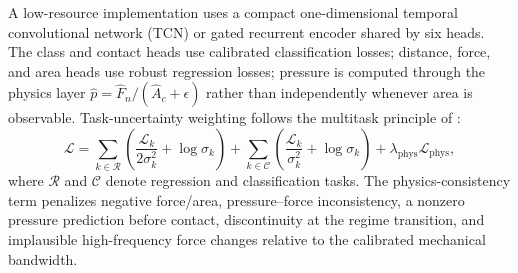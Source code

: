 \documentclass[10pt]{article}
\begin{document}
A low-resource implementation uses a compact one-dimensional temporal convolutional network (TCN) or gated recurrent encoder shared by six heads. The class and contact heads use calibrated classification losses; distance, force, and area heads use robust regression losses; pressure is computed through the physics layer $\hat p=\hat F_n/(\hat A_c+\epsilon)$ rather than independently whenever area is observable. Task-uncertainty weighting follows the multitask principle of \citet{kendall2018uncertainty}:
\begin{equation}
\mathcal{L}=\sum_{k\in\mathcal{R}}\left(\frac{\mathcal{L}_k}{2\sigma_k^2}+\log\sigma_k\right)+\sum_{k\in\mathcal{C}}\left(\frac{\mathcal{L}_k}{\sigma_k^2}+\log\sigma_k\right)+\lambda_{\mathrm{phys}}\mathcal{L}_{\mathrm{phys}},
\label{eq:multiloss}
\end{equation}
where $\mathcal{R}$ and $\mathcal{C}$ denote regression and classification tasks. The physics-consistency term penalizes negative force/area, pressure--force inconsistency, a nonzero pressure prediction before contact, discontinuity at the regime transition, and implausible high-frequency force changes relative to the calibrated mechanical bandwidth.
\end{document}
